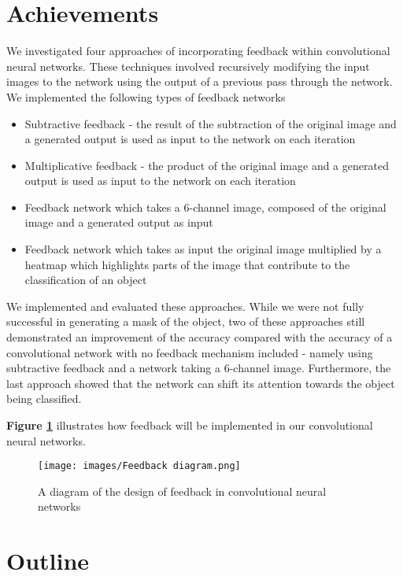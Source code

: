 \documentclass{l4proj}
\begin{document}
\section{Achievements}
We investigated four approaches of incorporating feedback within convolutional neural networks. These techniques involved recursively modifying the input images to the network using the output of a previous pass through the network. We implemented the following types of feedback networks

\begin{itemize}
    \item Subtractive feedback - the result of the subtraction of the original image and a generated output is used as input to the network on each iteration
    \item Multiplicative feedback - the product of the original image and a generated output is used as input to the network on each iteration
    \item Feedback network which takes a 6-channel image, composed of the original image and a generated output as input
    \item Feedback network which takes as input the original image multiplied by a heatmap which highlights parts of the image that contribute to the classification of an object 
\end{itemize}
We implemented and evaluated these approaches. While we were not fully successful in generating a mask of the object, two of these approaches still demonstrated an improvement of the accuracy compared with the accuracy of a convolutional network with no feedback mechanism included - namely using subtractive feedback and a network taking a 6-channel image. Furthermore, the last approach showed that the network can shift its attention towards the object being classified.

\textbf{Figure \ref{fig:feedbackdiagram}} illustrates how feedback will be implemented in our convolutional neural networks.

\begin{figure}[H]
    \centering
    \texttt{[image: images/Feedback diagram.png]}
    \caption{A diagram of the design of feedback in convolutional neural networks}
    \label{fig:feedbackdiagram} 
\end{figure}

\section{Outline}
\end{document}
